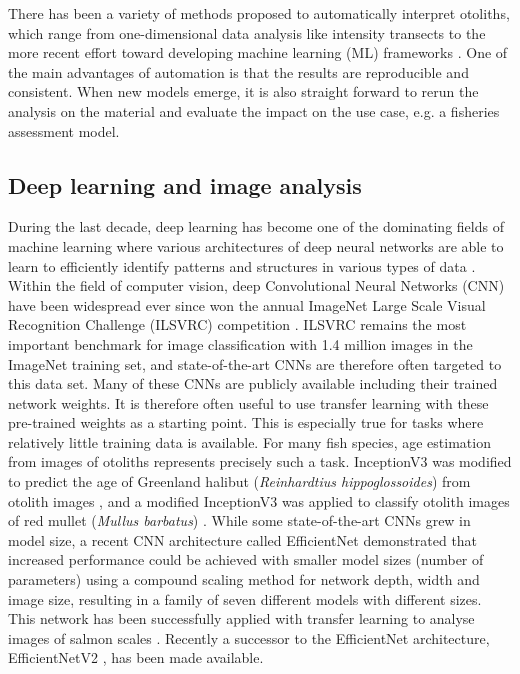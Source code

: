 \documentclass[10pt,letterpaper]{article}
\begin{document}
There has been a variety of methods proposed to automatically interpret otoliths, which range from one-dimensional data analysis like intensity transects \citep{Mahe} to the more recent effort toward developing machine learning (ML) frameworks \citep{moenetal, Politikos, sigurdhardottir2023otolith}. One of the main advantages of automation is that the results are reproducible and consistent. When new models emerge, it is also straight forward to rerun the analysis on the material and evaluate the impact on the use case, e.g. a fisheries assessment model.

\subsection{Deep learning and image analysis}

During the last decade, deep learning has become one of the dominating fields of machine learning where various architectures of deep neural networks are able to learn to efficiently identify patterns and structures in various types of data \citep{lecun2015deep}. Within the field of computer vision, deep Convolutional Neural Networks (CNN) have been widespread ever since 
\citet{krizhevsky_imagenet_2012}
won the annual ImageNet Large Scale Visual Recognition Challenge (ILSVRC) competition  \citep{Russakovsky2015}. ILSVRC remains the most important benchmark for image classification with 1.4 million images in the ImageNet training set, and state-of-the-art CNNs are therefore often targeted to this data set. Many of these CNNs are publicly available including their trained network weights. It is therefore often useful to use transfer learning with these pre-trained weights as a starting point.  This is especially true for tasks where relatively little training data is available. For many fish species, age estimation from images of otoliths represents precisely such a task. InceptionV3 \citep{Szegedy2015} was modified to predict the age of Greenland halibut (\textit{Reinhardtius hippoglossoides}) from otolith images \citep{moenetal}, and a modified InceptionV3 was applied to classify otolith images of red mullet (\textit{Mullus barbatus}) \citep{Politikos}. While some state-of-the-art CNNs grew in model size, a recent CNN architecture called EfficientNet \citep{DBLP:journals/corr/abs-1905-11946} demonstrated that increased performance could be achieved with smaller model sizes (number of parameters) using a compound scaling method for network depth, width and image size, resulting in a family of seven different models with different sizes. This network has been successfully applied with transfer learning to analyse images of salmon scales \citep{vaboeetal}. Recently a successor to the EfficientNet architecture, EfficientNetV2 \citep{EfficientNetV2}, has been made available.
\end{document}
